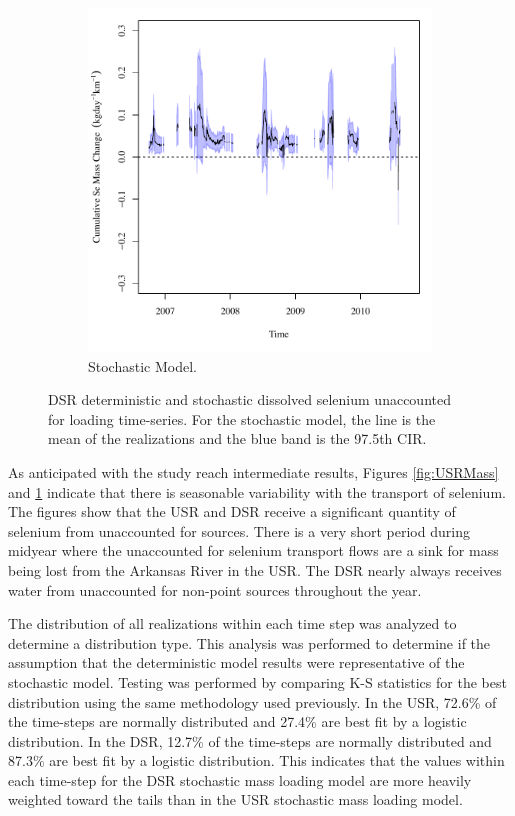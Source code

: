 \begin{linenumbers}
\begin{landscape}
\begin{figure}
\begin{subfigure}{0.7\textwidth}
			\includegraphics[width=\tableCustomSize]{"Figures/Results_DSR/Stochastic/Balance Mass"}
			\caption{Stochastic Model.}
		\end{subfigure}
		\caption[DSR deterministic and stochastic dissolved selenium unaccounted for loading time-series.]{DSR deterministic and stochastic dissolved selenium unaccounted for loading time-series.  For the stochastic model, the line is the mean of the realizations and the blue band is the 97.5th CIR.}
		\label{fig:DSRMass}
	\end{figure}
\end{landscape}

As anticipated with the study reach intermediate results, Figures \ref{fig:USRMass} and \ref{fig:DSRMass} indicate that there is seasonable variability with the transport of selenium.  The figures show that the USR and DSR receive a significant quantity of selenium from unaccounted for sources.  There is a very short period during midyear where the unaccounted for selenium transport flows are a sink for mass being lost from the Arkansas River in the USR.  The DSR nearly always receives water from unaccounted for non-point sources throughout the year.

The distribution of all realizations within each time step was analyzed to determine a distribution type.  This analysis was performed to determine if the assumption that the deterministic model results were representative of the stochastic model.   Testing was performed by comparing K-S statistics for the best distribution using the same methodology used previously.  In the USR, 72.6\% of the time-steps are normally distributed and 27.4\% are best fit by a logistic distribution.  In the DSR, 12.7\% of the time-steps are normally distributed and 87.3\% are best fit by a logistic distribution.  This indicates that the values within each time-step for the DSR stochastic mass loading model are more heavily weighted toward the tails than in the USR stochastic mass loading model.


\end{linenumbers}
